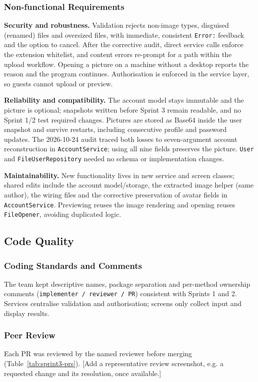 \documentclass[a4paper,11pt]{article}
\begin{document}
\subsubsection*{Non-functional Requirements}
\noindent\textbf{Security and robustness.} Validation rejects non-image types, disguised (renamed) files and oversized files, with immediate, consistent \texttt{Error:} feedback and the option to cancel. After the corrective audit, direct service calls enforce the extension whitelist, and content errors re-prompt for a path within the upload workflow. Opening a picture on a machine without a desktop reports the reason and the program continues. Authorisation is enforced in the service layer, so guests cannot upload or preview.

\noindent\textbf{Reliability and compatibility.} The account model stays immutable and the picture is optional; snapshots written before Sprint 3 remain readable, and no Sprint 1/2 test required changes. Pictures are stored as Base64 inside the user snapshot and survive restarts, including consecutive profile and password updates. The 2026-10-24 audit traced both losses to seven-argument account reconstruction in \texttt{AccountService}; using all nine fields preserves the picture. \texttt{User} and \texttt{FileUserRepository} needed no schema or implementation changes.

\noindent\textbf{Maintainability.} New functionality lives in new service and screen classes; shared edits include the account model/storage, the extracted image helper (same author), the wiring files and the corrective preservation of avatar fields in \texttt{AccountService}. Previewing reuses the image rendering and opening reuses \texttt{FileOpener}, avoiding duplicated logic.

\subsection{Code Quality}

\subsubsection*{Coding Standards and Comments}
The team kept descriptive names, package separation and per-method ownership comments (\texttt{implementer / reviewer / PR}) consistent with Sprints 1 and 2. Services centralise validation and authorisation; screens only collect input and display results.

\subsubsection*{Peer Review}
Each PR was reviewed by the named reviewer before merging (Table~\ref{tab:sprint3-prs}). [Add a representative review screenshot, e.g. a requested change and its resolution, once available.]
\end{document}
